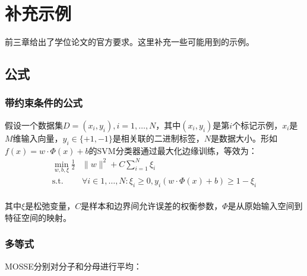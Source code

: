 \chapter{补充示例}

前三章给出了学位论文的官方要求。这里补充一些可能用到的示例。

\section{公式}

\subsection{带约束条件的公式}

假设一个数据集$D = {(x_i,y_i),i = 1,\dots,N}$，其中$(x_i,y_i)$是第$i$个标记示例，$x_i$是$M$维输入向量，$y_i\in\{+1,-1\}$是相关联的二进制标签，$N$是数据大小。形如$f(x)= w\cdot\Phi(x)+ b$的SVM分类器通过最大化边缘训练，等效为：
~\\
\begin{subequations}
\begin{align}
    \min_{w,b,\xi} \frac{1}{2}&\|w\|^2 + C\sum_{i=1}^N\xi_i\\
    \mathrm{s.t.}\quad &\forall i\in1,\dots,N:\xi_i\ge 0,y_i(w\cdot\Phi(x)+b)\ge 1-\xi_i
\end{align}
\label{eq:RT_SVMoptimizationFunction}
\end{subequations}
~\\
其中$\xi$是松弛变量，$C$是样本和边界间允许误差的权衡参数，$\Phi$是从原始输入空间到特征空间的映射。

\subsection{多等式}

MOSSE分别对分子和分母进行平均：

